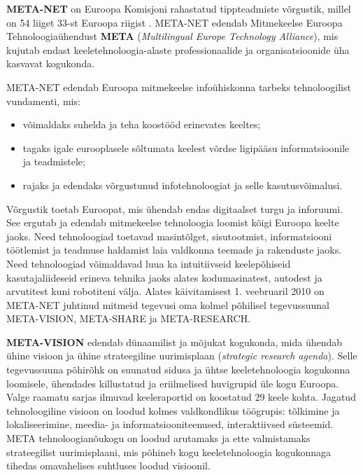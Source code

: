 
\begin{multicols}{2}

\textbf{META-NET} on Euroopa Komisjoni rahastatud tippteadmiste võrgustik, millel on 54 liiget 33-st Euroopa riigist \cite{rehm2011}. META-NET edendab Mitmekeelse Euroopa Tehnoloogiaühendust \textbf{META} (\textit{Multilingual Europe Technology Alliance}), mis kujutab endast keeletehnoloogia-alaste professionaalide ja organisatsioonide üha kasvavat kogukonda.

META-NET edendab Euroopa mitmekeelse infoühiskonna tarbeks tehnoloogilist vundamenti, mis: 

\begin{itemize}
\item võimaldaks suhelda ja teha koostööd erinevates keeltes;
\item tagaks igale eurooplasele sõltumata keelest võrdse ligipääsu informatsioonile ja teadmistele;
\item rajaks ja edendaks võrgustunud infotehnoloogiat ja selle kasutusvõimalusi.
\end{itemize}

Võrgustik toetab Euroopat, mis ühendab endas digitaalset turgu ja inforuumi. See ergutab ja edendab mitmekeelse tehnoloogia loomist kõigi Euroopa keelte jaoks.  Need tehnoloogiad toetavad masintõlget, sisutootmist, informatsiooni töötlemist ja teadmuse haldamist laia valdkonna teemade ja rakenduste jaoks. Need tehnoloogiad võimaldavad luua ka intuitiivseid keelepõhiseid kasutajaliideseid erineva tehnika jaoks alates kodumasinatest, autodest ja arvutitest kuni robotiteni välja.  Alates käivitamisest 1. veebruaril 2010 on META-NET juhtinud mitmeid tegevusi oma kolmel põhilisel tegevussuunal META-VISION, META-SHARE ja META-RESEARCH.

\textbf{META-VISION} edendab dünaamilist ja mõjukat kogukonda, mida ühendab ühine visioon ja ühine strateegiline uurimisplaan (\textit{strategic research agenda}). Selle tegevussuuna põhirõhk on suunatud sidusa ja ühtse keeletehnoloogia kogukonna loomisele, ühendades killustatud ja eriilmelised huvigrupid üle kogu Euroopa. Valge raamatu sarjas ilmuvad keeleraportid on koostatud 29 keele kohta.  Jagatud tehnoloogiline visioon on loodud kolmes valdkondlikus töögrupis: tõlkimine ja lokaliseerimine, meedia- ja informatsiooniteenused, interaktiivsed süsteemid.  META tehnoloogianõukogu on loodud arutamaks ja ette valmistamaks strateegilist uurimisplaani, mis põhineb kogu keeletehnoloogia kogukonnaga tihedas omavahelises suhtluses loodud visioonil.


\end{multicols}
